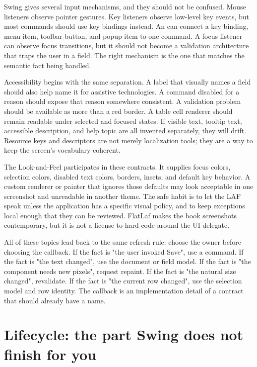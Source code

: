 Swing gives several input mechanisms, and they should not be confused. Mouse
listeners observe pointer gestures. Key listeners observe low-level key events,
but most commands should use key bindings instead. An  can connect a
key binding, menu item, toolbar button, and popup item to one command. A focus
listener can observe focus transitions, but it should not become a validation
architecture that traps the user in a field. The right mechanism is the one that
matches the semantic fact being handled.

Accessibility begins with the same separation. A label that visually names a
field should also help name it for assistive technologies. A command disabled
for a reason should expose that reason somewhere consistent. A validation
problem should be available as more than a red border. A table cell renderer
should remain readable under selected and focused states. If visible text,
tooltip text, accessible description, and help topic are all invented
separately, they will drift. Resource keys and descriptors are not merely
localization tools; they are a way to keep the screen's vocabulary coherent.

The Look-and-Feel participates in these contracts. It supplies focus colors,
selection colors, disabled text colors, borders, insets, and default key
behavior. A custom renderer or painter that ignores those defaults may look
acceptable in one screenshot and unreadable in another theme. The safe habit is
to let the LAF speak unless the application has a specific visual policy, and to
keep exceptions local enough that they can be reviewed. FlatLaf makes the book
screenshots contemporary, but it is not a license to hard-code around the UI
delegate.

All of these topics lead back to the same refresh rule: choose the owner before
choosing the callback. If the fact is "the user invoked Save", use a command. If
the fact is "the text changed", use the document or field model. If the fact is
"the component needs new pixels", request repaint. If the fact is "the natural
size changed", revalidate. If the fact is "the current row changed", use the
selection model and row identity. The callback is an implementation detail of a
contract that should already have a name.

\section{Lifecycle: the part Swing does not finish for you}

